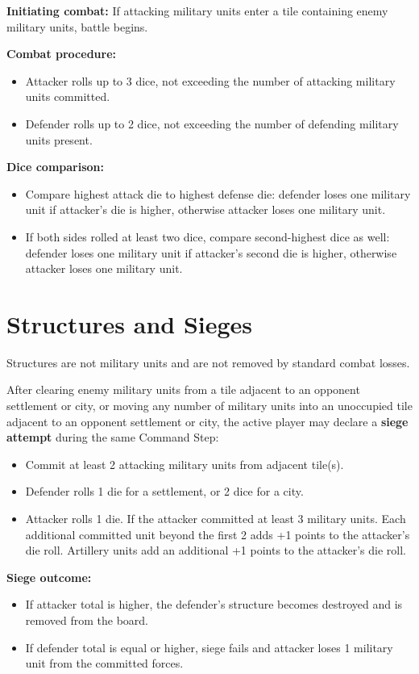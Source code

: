 \documentclass[12pt]{report}
\begin{document}
\textbf{Initiating combat:}
If attacking military units enter a tile containing enemy military units, battle begins.

\textbf{Combat procedure:}
\begin{itemize}[leftmargin=1.2cm]
  \item Attacker rolls up to 3 dice, not exceeding the number of attacking military units committed.
  \item Defender rolls up to 2 dice, not exceeding the number of defending military units present.
\end{itemize}

\textbf{Dice comparison:}
\begin{itemize}[leftmargin=1.2cm]
  \item Compare highest attack die to highest defense die: defender loses one military unit if attacker's die is higher, otherwise attacker loses one military unit.
  \item If both sides rolled at least two dice, compare second-highest dice as well: defender loses one military unit if attacker's second die is higher, otherwise attacker loses one military unit.
\end{itemize}

\section{Structures and Sieges}
Structures are not military units and are not removed by standard combat losses.

After clearing enemy military units from a tile adjacent to an opponent settlement or city, or moving any number of military units into an unoccupied tile adjacent to an opponent settlement or city, the active player may declare a \textbf{siege attempt} during the same Command Step:
\begin{itemize}[leftmargin=1.2cm]
  \item Commit at least 2 attacking military units from adjacent tile(s).
  \item Defender rolls 1 die for a settlement, or 2 dice for a city.
  \item Attacker rolls 1 die. If the attacker committed at least 3 military units. Each additional committed unit beyond the first 2 adds +1 points to the attacker's die roll. Artillery units add an additional +1 points to the attacker's die roll.
\end{itemize}

\textbf{Siege outcome:}
\begin{itemize}[leftmargin=1.2cm]
  \item If attacker total is higher, the defender's structure becomes destroyed and is removed from the board.
  \item If defender total is equal or higher, siege fails and attacker loses 1 military unit from the committed forces.
\end{itemize}
\end{document}
